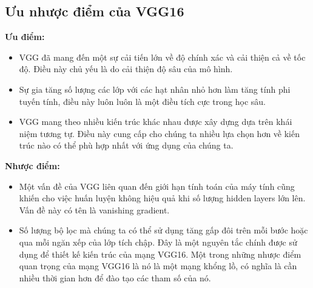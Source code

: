\subsection{Ưu nhược điểm của VGG16}
\textbf{Ưu điểm:}
\begin{itemize}
	\item VGG đã mang đến một sự cải tiến lớn về độ chính xác và cải thiện cả về tốc độ. Điều này chủ yếu là do cải thiện độ sâu của mô hình.
	\item Sự gia tăng số lượng các lớp với các hạt nhân nhỏ hơn làm tăng tính phi tuyến tính, điều này luôn luôn là một điều tích cực trong học sâu.
	\item VGG mang theo nhiều kiến trúc khác nhau được xây dựng dựa trên khái niệm tương tự. Điều này cung cấp cho chúng ta nhiều lựa chọn hơn về kiến trúc nào có thể phù hợp nhất với ứng dụng của chúng ta.
\end{itemize}
\textbf{Nhược điểm:}
\begin{itemize}
	\item Một vấn đề của VGG liên quan đến giới hạn tính toán của máy tính cũng khiến cho việc huấn luyện không hiệu quả khi số lượng hidden layers lớn lên. Vấn đề này có tên là vanishing gradient.
	\item Số lượng bộ lọc mà chúng ta có thể sử dụng tăng gấp đôi trên mỗi bước hoặc qua mỗi ngăn xếp của lớp tích chập. Đây là một nguyên tắc chính được sử dụng để thiết kế kiến trúc của mạng VGG16. Một trong những nhược điểm quan trọng của mạng VGG16 là nó là một mạng khổng lồ, có nghĩa là cần nhiều thời gian hơn để đào tạo các tham số của nó.
\end{itemize}

